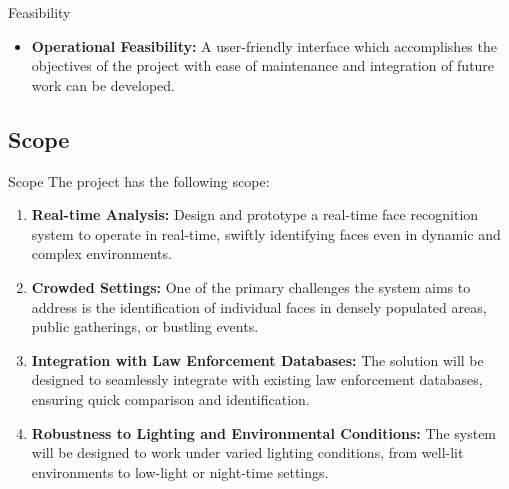 \begin{frame}[allowframebreaks]{Feasibility}
\begin{itemize}
		\item \textbf{Operational Feasibility:} A user-friendly interface which accomplishes the objectives of the project with ease of maintenance and integration of future work can be developed.
	\end{itemize}
\end{frame}

\subsection{Scope}
\begin{frame}{Scope}
	The project has the following scope:
	\begin{enumerate}
		\item \textbf{Real-time Analysis:} Design and prototype a real-time face recognition system to operate in real-time, swiftly identifying faces even in dynamic and complex environments.
		
		\item \textbf{Crowded Settings:} One of the primary challenges the system aims to address is the identification of individual faces in densely populated areas, public gatherings, or bustling events.
		
		\item \textbf{Integration with Law Enforcement Databases:} The solution will be designed to seamlessly integrate with existing law enforcement databases, ensuring quick comparison and identification.
		
		\item \textbf{Robustness to Lighting and Environmental Conditions:} The system will be designed to work under varied lighting conditions, from well-lit environments to low-light or night-time settings.
	\end{enumerate}
\end{frame}

